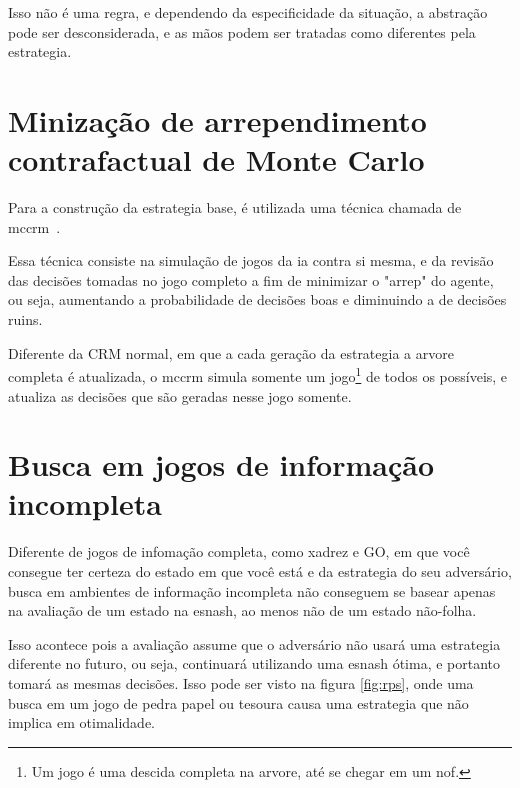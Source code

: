 \documentclass[twocolumn]{article}
\theoremstyle{mytheoremstyle}
\theoremstyle{mytheoremstyle}
\theoremstyle{myproblemstyle}
\begin{document}
            Isso não é uma regra, e dependendo da especificidade da situação, a abstração pode ser desconsiderada, e as mãos podem ser tratadas como
            diferentes pela \gls{estrategia}.



    \section{Minização de arrependimento contrafactual de Monte Carlo} %
    \label{sec:Minização de arrependimento contrafactual de Monte Carlo}
        Para a construção da \gls{estrategia} base, é utilizada uma técnica chamada de \acrfull{mccrm}~\cite{NIPS2009_00411460,brown2019solving}.

        Essa técnica consiste na simulação de jogos da \acrshort{ia} contra si mesma, e da revisão das decisões tomadas no jogo completo a fim de minimizar o "\gls{arrep}"
        do agente, ou seja, aumentando a probabilidade de decisões boas e diminuindo a de decisões ruins.

        Diferente da CRM normal, em que a cada geração da \gls{estrategia} a \gls{arvore} completa é atualizada, o \acrshort{mccrm} simula somente um jogo\footnote{Um jogo é uma descida
        completa na \gls{arvore}, até se chegar em um \gls{nof}.} de todos os possíveis, e atualiza as decisões que são geradas nesse jogo somente.


    \section{Busca em jogos de informação incompleta} %
    \label{sec:Busca em Jogos de informação incompleta}

        Diferente de jogos de infomação completa, como xadrez e GO, em que você consegue ter certeza do estado em que você está e da \gls{estrategia} do seu adversário,
        busca em ambientes de informação incompleta não conseguem se basear apenas na avaliação de um estado na \gls{esnash}, ao menos não de um estado não-folha.

        Isso acontece pois a avaliação assume que o adversário não usará uma \gls{estrategia} diferente no futuro, ou seja, continuará utilizando uma \gls{esnash}
        ótima, e portanto tomará as mesmas decisões. Isso pode ser visto na figura \ref{fig:rps}, onde uma busca em um jogo de pedra papel ou tesoura
        causa uma \gls{estrategia} que não implica em otimalidade.
\end{document}
